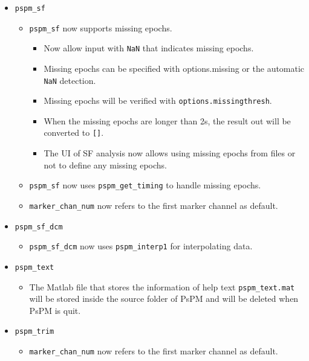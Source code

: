 \documentclass[english]{article}
\numberwithin{equation}{section}
\numberwithin{figure}{section}
\begin{document}
\begin{itemize}
    	\begin{itemize}
    		\item \texttt{pspm\_prepdata} now uses interpolation to handle data with \texttt{NaN}.
    		\begin{itemize}
    		\item Data that begins and/or ends with \texttt{NaN} will be filled with the first/last non-\texttt{NaN} values in those positions.
    		\end{itemize}
    	\end{itemize}
    	\item \texttt{pspm\_sf}
    	\begin{itemize}
    		\item \texttt{pspm\_sf} now supports missing epochs.
    		\begin{itemize}
    			\item Now allow input with \texttt{NaN} that indicates missing epochs. 
    			\item Missing epochs can be specified with options.missing or the automatic \texttt{NaN} detection. 
    			\item Missing epochs will be verified with \texttt{options.missingthresh}. 
    			\item When the missing epochs are longer than 2s, the result out will be converted to \texttt{[]}.
    			\item The UI of SF analysis now allows using missing epochs from files or not to define any missing epochs.
    		\end{itemize}
    		\item \texttt{pspm\_sf} now uses \texttt{pspm\_get\_timing} to handle missing epochs.
    		\item \texttt{marker\_chan\_num} now refers to the first marker channel as default.
    	\end{itemize}
    	\item \texttt{pspm\_sf\_dcm}
    	\begin{itemize}
    		\item \texttt{pspm\_sf\_dcm} now uses \texttt{pspm\_interp1} for interpolating data.
    	\end{itemize}
    	\item \texttt{pspm\_text}
    	\begin{itemize}
    		\item The Matlab file that stores the information of help text 
    					\texttt{pspm\_text.mat} will be stored inside the source folder of PsPM 
    					and will be deleted when PsPM is quit.
    	\end{itemize}
    	\item \texttt{pspm\_trim}
    	\begin{itemize}
    		\item \texttt{marker\_chan\_num} now refers to the first marker channel as default.
    	\end{itemize}
    \end{itemize}
    
\end{document}
